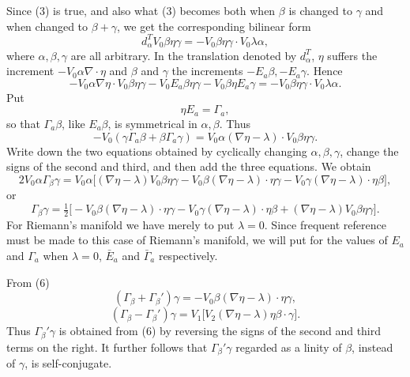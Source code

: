 \documentclass[11pt]{article}
\begin{document}
Since (3) is true, and also what (3) becomes both when $\beta$ is changed to $\gamma$ and when changed to $\beta+\gamma$, we get the corresponding bilinear form
\begin{equation}d_\alpha^T V_0\beta\eta\gamma=-V_0\beta\eta\gamma\cdot V_0\lambda\alpha,\tag{4}\end{equation}
where $\alpha,\beta,\gamma$ are all arbitrary. In the translation denoted by $d_\alpha^T$, $\eta$ suffers the increment $-V_0\alpha\nabla\cdot\eta$ and $\beta$ and $\gamma$ the increments $-E_a\beta,-E_a\gamma$. Hence
\[
-V_0\alpha\nabla\eta\cdot V_0\beta\eta\gamma-V_0E_a\beta\eta\gamma-V_0\beta\eta E_a\gamma=-V_0\beta\eta\gamma\cdot V_0\lambda\alpha.
\]
Put
\begin{equation}\eta E_a=\Gamma_a,\tag{5}\end{equation}
so that $\Gamma_a\beta$, like $E_a\beta$, is symmetrical in $\alpha,\beta$. Thus
\[
-V_0(\gamma\Gamma_a\beta+\beta\Gamma_a\gamma)=V_0\alpha(\nabla\eta-\lambda)\cdot V_0\beta\eta\gamma.
\]
Write down the two equations obtained by cyclically changing $\alpha,\beta,\gamma$, change the signs of the second and third, and then add the three equations. We obtain
\[
2V_0\alpha\Gamma_\beta\gamma=V_0\alpha\bigl[(\nabla\eta-\lambda)V_0\beta\eta\gamma-V_0\beta(\nabla\eta-\lambda)\cdot\eta\gamma-V_0\gamma(\nabla\eta-\lambda)\cdot\eta\beta\bigr],
\]
or
\begin{equation}\Gamma_\beta\gamma=\tfrac12\bigl[-V_0\beta(\nabla\eta-\lambda)\cdot\eta\gamma-V_0\gamma(\nabla\eta-\lambda)\cdot\eta\beta+(\nabla\eta-\lambda)V_0\beta\eta\gamma\bigr].\tag{6}\end{equation}
For Riemann's manifold we have merely to put $\lambda=0$. Since frequent reference must be made to this case of Riemann's manifold, we will put for the values of $E_a$ and $\Gamma_a$ when $\lambda=0$, $\bar E_a$ and $\bar\Gamma_a$ respectively.

\indent From (6)
\begin{equation}(\Gamma_\beta+\Gamma_\beta')\gamma=-V_0\beta(\nabla\eta-\lambda)\cdot\eta\gamma,\tag{7}\end{equation}
\begin{equation}(\Gamma_\beta-\Gamma_\beta')\gamma=V_1\bigl[V_2(\nabla\eta-\lambda)\eta\beta\cdot\gamma\bigr].\tag{8}\end{equation}
Thus $\Gamma_\beta'\gamma$ is obtained from (6) by reversing the signs of the second and third terms on the right. It further follows that $\Gamma_\beta'\gamma$ regarded as a linity of $\beta$, instead of $\gamma$, is self-conjugate.
\end{document}
